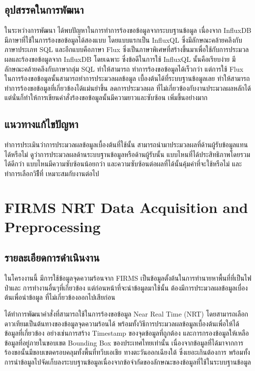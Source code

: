 \documentclass{report}
\begin{document}
\subsection{อุปสรรคในการพัฒนา}
ในระหว่างการพัฒนา ได้พบปัญหาในการทำการร้องขอข้อมูลจากระบบฐานข้อมูล เนื่องจาก InfluxDB 
มีภาษาที่ใช้ในการร้องขอข้อมูลได้สองแบบ 
โดยแบบแรกเป็น InfluxQL ซึ่งมีลักษณะคล้ายคลึงกับภาษาประเภท SQL และอีกแบบคือภาษา Flux
ซึ่งเป็นภาษาพิเศษที่สร้างขึ้นมาเพื่อใช้กับการประมวลผลและร้องขอข้อมูลจาก InfluxDB โดยเฉพาะ
ซึ่งข้อดีในการใช้ InfluxQL นั้นคือเรียบง่าย มีลักษณะคล้ายคลึงกับภาษากลุ่ม SQL ทำให้สามารถ
ทำการร้องขอข้อมูลได้เร็วกว่า แต่การใช้ Flux ในการร้องขอข้อมูลนั้นสามารถทำการประมวลผลข้อมูล%
เบื้องต้นได้ที่ระบบฐานข้อมูลเลย ทำให้สามารถทำการร้องขอข้อมูลที่เกี่ยวข้องได้แม่นยำขึ้น ลดการประมวลผล%
ที่ไม่เกี่ยวข้องกับงานประมวลผลหลักได้ แต่นั่นก็ทำให้การเขียนคำสั่งร้องขอข้อมูลนั้นมีความยาวและซับซ้อน%
เพิ่มขึ้นอย่างมาก

\subsection{แนวทางแก้ไขปัญหา}
ทำการประเมินว่าการประมวลผลข้อมูลเบื้องต้นที่ใช้นั้น สามารถนำมาประมวลผลที่ด้านผู้รับข้อมูลแทนได้หรือไม่
ดูว่าการประมวลผลด้านระบบฐานข้อมูลหรือด้านผู้รับนั้น แบบไหนที่ได้ประสิทธิภาพโดยรวมได้ดีกว่า 
แบบไหนมีความซับซ้อนน้อยกว่า และความซับซ้อนต่อผลที่ได้นั้นคุ้มค่าที่จะใช้หรือไม่ และทำการเลือกวิธีืที่%
เหมาะสมกับงานต่อไป

\section{FIRMS NRT Data Acquisition and Preprocessing}
\subsection{รายละเอียดการดำเนินงาน}
ในโครงงานนี้ มีการใช้ข้อมูลจุดความร้อนจาก FIRMS เป็นข้อมูลตั้งต้นในการทำนายหาพื้นที่ที่เป็นไฟป่าและ%
การทำงานอื่นๆที่เกี่ยวข้อง แต่ก่อนหน้าที่จะนำข้อมูลมาใช้นั้น ต้องมีการประมวลผลข้อมูลเบื่องต้นเพื่อนำข้อมูล%
ที่ไม่เกี่ยวข้องออกไปเสียก่อน

ได้ทำการพัฒนาคำสั่งที่สามารถใช้ในการร้องขอข้อมูล Near Real Time (NRT) 
โดยสามารถเลือกดาวเทียมเป็นต้นทางของข้อมูลจุดความร้อนได้
พร้อมทั้งวิธีการประมวลผลข้อมูลเบื้องต้นเพื่อให้ได้ข้อมูลที่เกี่ยวข้อง อย่างเช่นการสร้าง Timestamp
ของจุดข้อมูลที่ถูกต้อง และการกรองข้อมูลให้เหลือข้อมูลที่อยู่ภายในขอบเขต Bounding Box 
ของประเทศไทยเท่านั้น เนื่องจากข้อมูลที่ได้มาจากการร้องขอนั้นมีขอบเขตครอบคลุมทั้งพื้นที่ทวีบเอเชีย
ทางตะวันออกเฉียงใต้ ซึ่งเยอะเกินต้องการ
พร้อมทั้งการนำข้อมูลไปจัดเก็บลงระบบฐานข้อมูลเนื่องจากข้อจำกัดของลักษณะของข้อมูลที่ใช้ในระบบฐานข้อมูล
\end{document}
